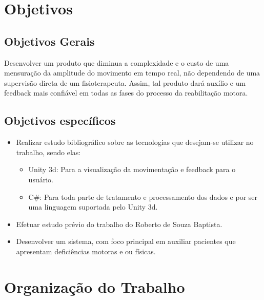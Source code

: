 \section{Objetivos}
\label{Sec:Objetivos}
\subsection{Objetivos Gerais}
\label{Sub:ObjetivosGerais}
  Desenvolver um produto que diminua a complexidade e o custo de uma mensuração
da amplitude do movimento em tempo real, não dependendo de uma supervisão direta de um fisioterapeuta.
Assim, tal produto dará auxílio e um feedback mais
confiável em todas as fases do processo da reabilitação motora.

\subsection{Objetivos específicos}
\label{Sub:ObjetivosEspecificos}
\begin{itemize}

\item Realizar estudo bibliográfico sobre as tecnologias que desejam-se
utilizar no trabalho, sendo elas:
  \begin{itemize}
    \item Unity 3d: Para a visualização da movimentação e feedback para o usuário.
    \item C\#: Para toda parte de tratamento e processamento dos dados e por ser uma linguagem suportada pelo Unity 3d.
  \end{itemize}

\item Efetuar estudo prévio do trabalho do Roberto de Souza Baptista.

\item Desenvolver um sistema, com foco principal em auxiliar pacientes que apresentam deficiências
motoras e ou físicas.

\end{itemize}

\section{Organização do Trabalho}

